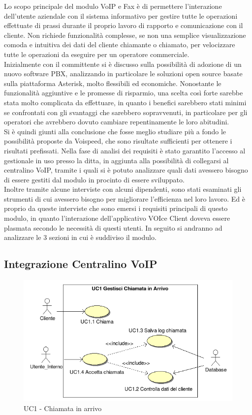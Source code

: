 Lo scopo principale del modulo VoIP e Fax \`e di permettere l'interazione dell'utente aziendale con il sistema informativo per gestire tutte le operazioni effettuate di prassi durante il proprio lavoro di rapporto e comunicazione con il cliente. Non richiede funzionalit\`a complesse, se non una semplice visualizzazione comoda e intuitiva dei dati del cliente chiamante o chiamato, per velocizzare tutte le operazioni da eseguire per un operatore commerciale. \\
Inizialmente con il committente si \`e discusso sulla possibilit\`a di adozione di un nuovo software PBX, analizzando in particolare le soluzioni open source basate sulla piattaforma Asterisk, molto flessibili ed economiche. Nonostante le funzionalit\`a aggiuntive e le promesse di risparmio, una scelta cos\`i forte sarebbe stata molto complicata da effettuare, in quanto i benefici sarebbero stati minimi se confrontati con gli svantaggi che sarebbero sopravvenuti, in particolare per gli operatori che avrebbero dovuto cambiare repentinamente le loro abitudini. \\
Si \`e quindi giunti alla conclusione che fosse meglio studiare pi\`u a fondo le possibilit\`a proposte da Voispeed, che sono risultate sufficienti per ottenere i risultati prefissati. Nella fase di analisi dei requisiti \`e stato garantito l'accesso al gestionale in uso presso la ditta, in aggiunta alla possibilit\`a di collegarsi al centralino VoIP, tramite i quali si \`e potuto analizzare quali dati avessero bisogno di essere gestiti dal modulo in procinto di essere sviluppato. \\
Inoltre tramite alcune interviste con alcuni dipendenti, sono stati esaminati gli strumenti di cui avessero bisogno per migliorare l'efficienza nel loro lavoro. Ed \`e proprio da queste interviste che sono emersi i requisiti principali di questo modulo, in quanto l'interazione dell'applicativo VOIce Client doveva essere plasmata secondo le necessit\`a di questi utenti. In seguito si andranno ad analizzare le 3 sezioni in cui \`e suddiviso il modulo.

\newpage
\subsection{Integrazione Centralino VoIP}
\begin{figure}[!ht]
\centering
 \includegraphics[scale=0.8]{./images/UC1_chiamata.png}
\caption{UC1 - Chiamata in arrivo}
\end{figure}

